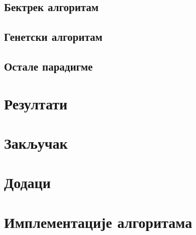 \documentclass[a4paper, 12pt, ngerman]{article}
\let\oldsection\section
\renewcommand\section{\clearpage\oldsection}
\let\oldsubsection\subsection
\renewcommand\subsection{\clearpage\oldsubsection}
\begin{document}
\subsection{Бектрек алгоритам}

\subsection{Генетски алгоритам}

\subsection{Остале парадигме}

\section{Резултати}

\section{Закључак}

\appendix
{}
\section*{Додаци}
\section{Имплементације алгоритама}


\pagebreak


\pagebreak


\pagebreak


\pagebreak


\pagebreak
\end{document}
